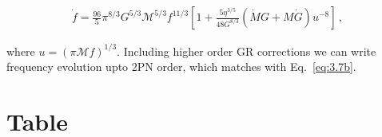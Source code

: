 \documentclass[11pt]{article}
\begin{document}
 \begin{align} 
 \dot{f}=\frac{96}{5}\pi^{8/3}G^{5/3}\mathcal{M}^{5/3}f^{11/3}[1+\frac{5\eta^{3/5}}{48 G^{8/3}}(\dot{M}G+M\dot{G})u^{-8}]\,,
 \end{align} 
 
 
 where $u=(\pi \mathcal{M}f)^{1/3}$. Including higher order GR corrections we can write frequency evolution upto 2PN order, which matches with Eq.~\eqref{eq:3.7b}.
 
 
  \newpage
 \section{Table}
\end{document}
